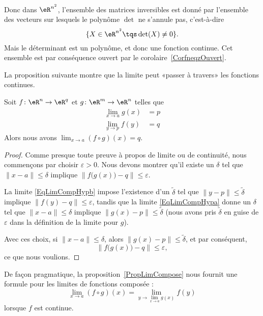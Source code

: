 \begin{example}
	Donc dans \( \eR^{n^2}\), l'ensemble des matrices inversibles est donné par l'ensemble des vecteurs sur lesquels le polynôme \( \det\) ne s'annule pas, c'est-à-dire
	\begin{equation}
		\{ X\in\eR^{n^2}\tqs \det(X)\neq 0 \}.
	\end{equation}
	Mais le déterminant est un polynôme, et donc une fonction continue. Cet ensemble est par conséquence ouvert par le corolaire~\ref{CorfneqzOuvert}.
\end{example}

La proposition suivante montre que la limite peut «passer à travers» les fonctions continues.
\begin{proposition}		\label{PropLimCompose}
	Soit \( f\colon \eR^n\to \eR^q\) et \( g\colon \eR^m\to \eR^n\) telles que
	\begin{subequations}
		\begin{align}
			\lim_{x\to a} g(x) & = p		\label{EqLimCompHypa} \\
			\lim_{y\to p} f(y) & = q		\label{EqLimCompHypb}
		\end{align}
	\end{subequations}
	Alors nous avons \( \lim_{x\to a} (f\circ g)(x)=q\).
\end{proposition}

\begin{proof}
	Comme presque toute preuve à propos de limite ou de continuité, nous commençons par choisir \( \varepsilon>0\). Nous devons montrer qu'il existe un \( \delta\) tel que \( \| x-a \|\leq \delta\) implique \( \| f\big( g(x) \big)-q \|\leq \varepsilon\).

	La limite \eqref{EqLimCompHypb} impose l'existence d'un \( \tilde\delta\) tel que \( \| y-p \|\leq\tilde\delta\) implique \( \| f(y)-q \|\leq\varepsilon\), tandis que la limite \eqref{EqLimCompHypa} donne un \( \delta\) tel que \( \| x-a \|\leq\delta\) implique \( \| g(x)-p \|\leq\tilde\delta\) (nous avons pris \( \tilde\delta\) en guise de \( \varepsilon\) dans la définition de la limite pour \( g\)).

	Avec ces choix, si \( \| x-a \|\leq \delta\), alors \( \| g(x)-p \|\leq\tilde\delta\), et par conséquent,
	\begin{equation}
		\| f\big( g(x) \big)-q \|\leq\varepsilon,
	\end{equation}
	ce que nous voulions.
\end{proof}

De façon pragmatique, la proposition~\ref{PropLimCompose} nous fournit une formule pour les limites de fonctions composée :
\begin{equation}		\label{Eqlimfgvomp}
	\lim_{x\to a} (f\circ g)(x)=\lim_{y\to \lim_{x\to a} g(x)}f(y)
\end{equation}
lorsque \( f\) est continue.

